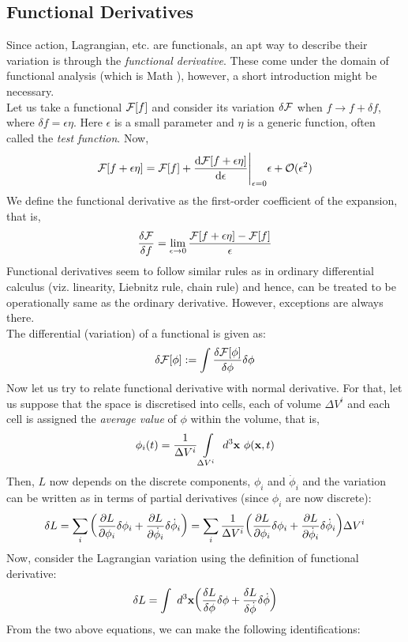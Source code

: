 \subsection{Functional Derivatives}
Since action, Lagrangian, etc. are functionals, an apt way to describe their variation is through the \textit{functional derivative}. These come under the domain of functional analysis (which is Math ), however, a short introduction might be necessary. \\[0.2cm]
Let us take a functional $\mathcal F[f]$ and consider its variation $\delta \mathcal F$ when $f\rightarrow f+\delta f$, where $\delta f = \epsilon \eta$. Here $\epsilon$ is a small parameter and $\eta$ is a generic function, often called the \textit{test function}. Now,
\begin{align*}
    \mathcal F[f+\epsilon \eta] = \mathcal F[f] + \dv{\mathcal F[f+\epsilon\eta ]}{\epsilon}\Bigg|_{\epsilon=0}\epsilon + \mathcal O(\epsilon^2)
\end{align*}
We define the functional derivative as the first-order coefficient of the expansion, that is,
$$\frac{\delta\mathcal F}{\delta f} = \lim\limits_{\epsilon\rightarrow 0} \frac{\mathcal F[f+\epsilon \eta] - \mathcal F[f]}{\epsilon}$$
Functional derivatives seem to follow similar rules as in ordinary differential calculus (viz. linearity, Liebnitz rule, chain rule) and hence, can be treated to be operationally same as the ordinary derivative. However, exceptions are always there.\\[0.2cm]
The differential (variation) of a functional is given as:
$$\delta \mathcal F[\phi] := \int \frac{\delta\mathcal F[\phi]}{\delta \phi}\delta\phi$$
Now let us try to relate functional derivative with normal derivative. For that, let us suppose that the space is discretised into cells, each of volume $\Delta V^i$ and each cell is assigned the \textit{average value} of $\phi$ within the volume, that is,
$$\phi_i(t) = \frac{1}{\Delta V^i} \int\limits_{\Delta V^i} \ d^3 \vb{x}\ \phi(\vb{x},t)$$
Then, $L$ now depends on the discrete components, $\phi_i$ and $\dot{\phi}_i$ and the variation can be written as in terms of partial derivatives (since $\phi_i$ are now discrete):
$$\delta L = \sum\limits_i\qty(\pdv{L}{\phi_i}\delta \phi_i+\pdv{L}{\dot{\phi}_i}\delta \dot{\phi}_i) = \sum\limits_i\frac{1}{\Delta V^i}\qty(\pdv{L}{\phi_i}\delta \phi_i+\pdv{L}{\dot{\phi}_i}\delta \dot{\phi}_i)\Delta V^i$$
Now, consider the Lagrangian variation using the definition of functional derivative:
$$\delta L = \int \ d^3\vb{x} \qty(\frac{\delta L}{\delta \phi}\delta\phi + \frac{\delta L}{\delta \dot{\phi}}\delta\dot{\phi})$$
From the two above equations, we can make the following identifications:

